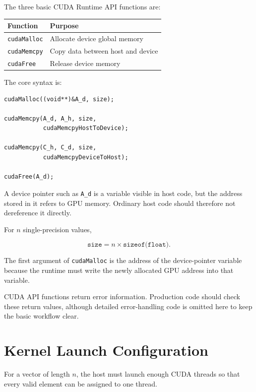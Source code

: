 \documentclass[11pt,a4paper]{article}
\begin{document}
The three basic CUDA Runtime API functions are:

\begin{center}
\begin{tabular}{ll}
\toprule
Function & Purpose \\
\midrule
\texttt{cudaMalloc} & Allocate device global memory \\
\texttt{cudaMemcpy} & Copy data between host and device \\
\texttt{cudaFree} & Release device memory \\
\bottomrule
\end{tabular}
\end{center}

The core syntax is:

\begin{lstlisting}
cudaMalloc((void**)&A_d, size);

cudaMemcpy(A_d, A_h, size,
           cudaMemcpyHostToDevice);

cudaMemcpy(C_h, C_d, size,
           cudaMemcpyDeviceToHost);

cudaFree(A_d);
\end{lstlisting}

A device pointer such as \texttt{A\_d} is a variable visible in host code, but the address stored in it refers to GPU memory. Ordinary host code should therefore not dereference it directly.

For \(n\) single-precision values,

\[
\texttt{size}
=
n\times\texttt{sizeof(float)}.
\]

The first argument of \texttt{cudaMalloc} is the address of the device-pointer variable because the runtime must write the newly allocated GPU address into that variable.

CUDA API functions return error information. Production code should check these return values, although detailed error-handling code is omitted here to keep the basic workflow clear.

\section{Kernel Launch Configuration}

For a vector of length \(n\), the host must launch enough CUDA threads so that every valid element can be assigned to one thread.
\end{document}
